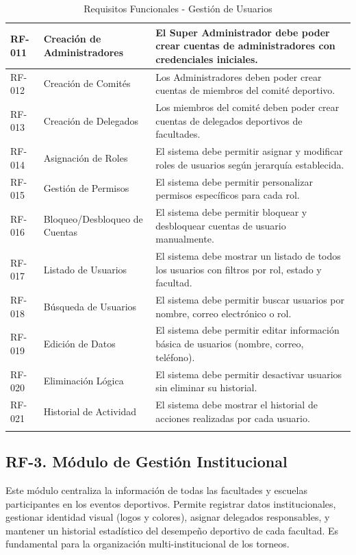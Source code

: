 \documentclass[12pt,a4paper]{article}
\begin{document}
\begin{longtable}{|>{\centering\arraybackslash}p{1.5cm}|>{\raggedright\arraybackslash}p{3.2cm}|>{\raggedright\arraybackslash}p{9cm}|}
RF-011 & Creación de Administradores & El Super Administrador debe poder crear cuentas de administradores con credenciales iniciales. \\
\hline
\rowcolor{rowgray}
RF-012 & Creación de Comités & Los Administradores deben poder crear cuentas de miembros del comité deportivo. \\
\hline
RF-013 & Creación de Delegados & Los miembros del comité deben poder crear cuentas de delegados deportivos de facultades. \\
\hline
\rowcolor{rowgray}
RF-014 & Asignación de Roles & El sistema debe permitir asignar y modificar roles de usuarios según jerarquía establecida. \\
\hline
RF-015 & Gestión de Permisos & El sistema debe permitir personalizar permisos específicos para cada rol. \\
\hline
\rowcolor{rowgray}
RF-016 & Bloqueo/Desbloqueo de Cuentas & El sistema debe permitir bloquear y desbloquear cuentas de usuario manualmente. \\
\hline
RF-017 & Listado de Usuarios & El sistema debe mostrar un listado de todos los usuarios con filtros por rol, estado y facultad. \\
\hline
\rowcolor{rowgray}
RF-018 & Búsqueda de Usuarios & El sistema debe permitir buscar usuarios por nombre, correo electrónico o rol. \\
\hline
RF-019 & Edición de Datos & El sistema debe permitir editar información básica de usuarios (nombre, correo, teléfono). \\
\hline
\rowcolor{rowgray}
RF-020 & Eliminación Lógica & El sistema debe permitir desactivar usuarios sin eliminar su historial. \\
\hline
RF-021 & Historial de Actividad & El sistema debe mostrar el historial de acciones realizadas por cada usuario. \\
\hline
\caption{Requisitos Funcionales - Gestión de Usuarios}
\end{longtable}

\subsection{RF-3. Módulo de Gestión Institucional}

Este módulo centraliza la información de todas las facultades y escuelas participantes en los eventos deportivos. Permite registrar datos institucionales, gestionar identidad visual (logos y colores), asignar delegados responsables, y mantener un historial estadístico del desempeño deportivo de cada facultad. Es fundamental para la organización multi-institucional de los torneos.
\end{document}
